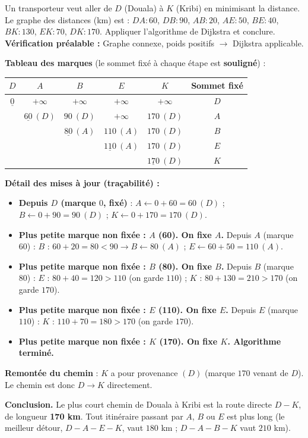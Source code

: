 \documentclass[11pt]{article}
\begin{document}
\begin{exoresolu}
Un transporteur veut aller de $D$ (Douala) à $K$ (Kribi) en minimisant la distance. Le graphe des distances (km) est : $DA:60$, $DB:90$, $AB:20$, $AE:50$, $BE:40$, $BK:130$, $EK:70$, $DK:170$. Appliquer l'algorithme de Dijkstra et conclure.
\tcblower
\textbf{Vérification préalable :} Graphe connexe, poids positifs $\to$ Dijkstra applicable.

\textbf{Tableau des marques} (le sommet fixé à chaque étape est \textbf{souligné}) :

\begin{center}
\begin{tabular}{|c|c|c|c|c|c|}
\hline
\rowcolor{popblueL} $D$ & $A$ & $B$ & $E$ & $K$ & Sommet fixé \\
\hline
$\underline{0}$ & $+\infty$ & $+\infty$ & $+\infty$ & $+\infty$ & $D$ \\
\hline
 & $\underline{60}\ (D)$ & $90\ (D)$ & $+\infty$ & $170\ (D)$ & $A$ \\
\hline
 &  & $\underline{80}\ (A)$ & $110\ (A)$ & $170\ (D)$ & $B$ \\
\hline
 &  &  & $\underline{110}\ (A)$ & $170\ (D)$ & $E$ \\
\hline
 &  &  &  & $\underline{170}\ (D)$ & $K$ \\
\hline
\end{tabular}
\end{center}

\textbf{Détail des mises à jour (traçabilité) :}
\begin{itemize}
\item \textbf{Depuis $D$ (marque $0$, fixé)} : $A \leftarrow 0+60=60\ (D)$ ; $B \leftarrow 0+90=90\ (D)$ ; $K \leftarrow 0+170=170\ (D)$.
\item \textbf{Plus petite marque non fixée : $A$ (60). On fixe $A$.}
  Depuis $A$ (marque $60$) : $B$ : $60+20 = 80 < 90 \to B \leftarrow 80\ (A)$ ; $E \leftarrow 60+50 = 110\ (A)$.
\item \textbf{Plus petite marque non fixée : $B$ (80). On fixe $B$.}
  Depuis $B$ (marque $80$) : $E$ : $80+40 = 120 > 110$ (on garde $110$) ; $K$ : $80+130 = 210 > 170$ (on garde $170$).
\item \textbf{Plus petite marque non fixée : $E$ (110). On fixe $E$.}
  Depuis $E$ (marque $110$) : $K$ : $110+70 = 180 > 170$ (on garde $170$).
\item \textbf{Plus petite marque non fixée : $K$ (170). On fixe $K$. Algorithme terminé.}
\end{itemize}

\textbf{Remontée du chemin} : $K$ a pour provenance $(D)$ (marque $170$ venant de $D$). Le chemin est donc $D \to K$ directement.

\textbf{Conclusion.} Le plus court chemin de Douala à Kribi est la route directe $D-K$, de longueur \textbf{170 km}. Tout itinéraire passant par $A$, $B$ ou $E$ est plus long (le meilleur détour, $D-A-E-K$, vaut $180$ km ; $D-A-B-K$ vaut $210$ km).
\end{exoresolu}
\end{document}

